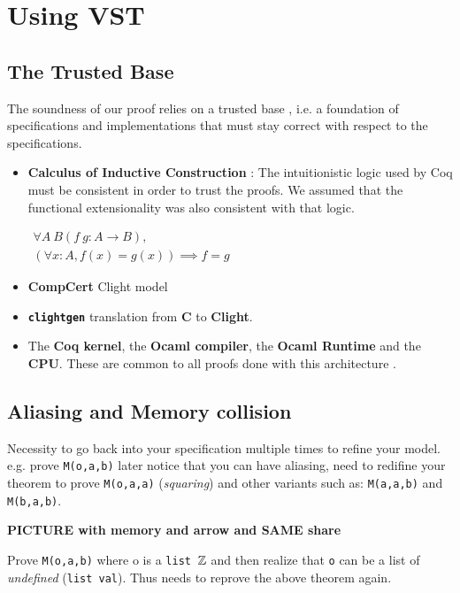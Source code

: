 \section{Using VST}

\subsection{The Trusted Base}

The soundness of our proof relies on a trusted base
, i.e. a foundation of specifications and implementations
that must stay correct with respect to the specifications.

\begin{itemize}
  \item \textbf{Calculus of Inductive Construction} : The intuitionistic logic
  used by Coq must be consistent in order to trust the proofs. We assumed that
  the functional extensionality was also consistent with that logic.

$
\begin{array}{c}
  \forall A\ B (f\ g : A \to B ),\\
  ( \forall x : A , f(x) = g(x) ) \implies f = g
\end{array}
$
  \item \textbf{CompCert} Clight model

  \item \textbf{\texttt{clightgen}} translation from \textbf{C} to
  \textbf{Clight}.

  \item The \textbf{Coq kernel}, the \textbf{Ocaml compiler},
  the \textbf{Ocaml Runtime} and the \textbf{CPU}. These are common to all proofs
  done with this architecture \cite{2015-Appel,coq-faq}.
\end{itemize}

\subsection{Aliasing and Memory collision}

Necessity to go back into your specification multiple times to refine your model.
e.g. prove \texttt{M(o,a,b)} later notice that you can have aliasing, need to redifine
your theorem to prove \texttt{M(o,a,a)} (\textit{squaring}) and other variants such as:
\texttt{M(a,a,b)} and \texttt{M(b,a,b)}.

\textbf{PICTURE with memory and arrow and SAME share}

Prove \texttt{M(o,a,b)} where o is a \texttt{list $\mathbb{Z}$} and then realize that
\texttt{o} can be a list of \textit{undefined} (\texttt{list val}). Thus needs
to reprove the above theorem again.

